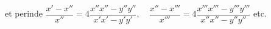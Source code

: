 et perinde
\(\dfrac{x'-x''}{x''}=4\dfrac{x''x''-y''y''}{x'x'-y'y'},\quad
\dfrac{x''-x'''}{x'''}=4\dfrac{x'''x'''-y'''y'''}{x''x''-y''y''}\) etc.